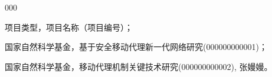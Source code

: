 \begin{publicationsProjects}{000}

    \item [{[1]}]  项目类型，项目名称（项目编号）；

    \item [{[2]}]  国家自然科学基金，基于安全移动代理新一代网络研究(000000000001)；
    
    \item [{[3]}]  国家自然科学基金，移动代理机制关键技术研究(000000000002), 张嫚嫚。

\end{publicationsProjects}

